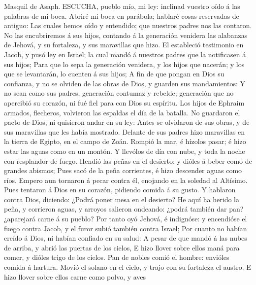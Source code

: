  Masquil de Asaph. ESCUCHA, pueblo mío, mi ley: inclinad
vuestro oído á las palabras de mi boca.  Abriré mi boca en
parábola; hablaré cosas reservadas de antiguo:  Las cuales
hemos oído y entendido; que nuestros padres nos las contaron.
 No las encubriremos á sus hijos, contando á la generación
venidera las alabanzas de Jehová, y su fortaleza, y sus maravillas que
hizo.  El estableció testimonio en Jacob, y pusó ley en
Israel; la cual mandó á nuestros padres que la notificasen á sus hijos;
 Para que lo sepa la generación venidera, y los hijos que
nacerán; y los que se levantarán, lo cuenten á sus hijos;  A
fin de que pongan en Dios su confianza, y no se olviden de las obras de
Dios, y guarden sus mandamientos:  Y no sean como sus
padres, generación contumaz y rebelde; generación que no apercibió su
corazón, ni fué fiel para con Dios su espíritu.  Los hijos
de Ephraim armados, flecheros, volvieron las espaldas el día de la
batalla.  No guardaron el pacto de Dios, ni quisieron andar
en su ley:  Antes se olvidaron de sus obras, y de sus
maravillas que les había mostrado.  Delante de sus padres
hizo maravillas en la tierra de Egipto, en el campo de Zoán.
 Rompió la mar, é hízolos pasar; é hizo estar las aguas
como en un montón.  Y llevólos de día con nube, y toda la
noche con resplandor de fuego.  Hendió las peñas en el
desierto: y dióles á beber como de grandes abismos;  Pues
sacó de la peña corrientes, é hizo descender aguas como ríos.
 Empero aun tornaron á pecar contra él, enojando en la
soledad al Altísimo.  Pues tentaron á Dios en su corazón,
pidiendo comida á su gusto.  Y hablaron contra Dios,
diciendo: ¿Podrá poner mesa en el desierto?  He aquí ha
herido la peña, y corrieron aguas, y arroyos salieron ondeando: ¿podrá
también dar pan? ¿aparejará carne á su pueblo?  Por tanto
oyó Jehová, é indignóse: y encendióse el fuego contra Jacob, y el furor
subió también contra Israel;  Por cuanto no habían creído á
Dios, ni habían confiado en su salud:  A pesar de que mandó
á las nubes de arriba, y abrió las puertas de los cielos, 
E hizo llover sobre ellos maná para comer, y dióles trigo de los cielos.
 Pan de nobles comió el hombre: envióles comida á hartura.
 Movió el solano en el cielo, y trajo con su fortaleza el
austro.  E hizo llover sobre ellos carne como polvo, y aves
